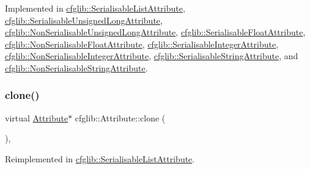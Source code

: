 Implemented in \hyperlink{classcfglib_1_1SerialisableListAttribute_a8fe3db52648fbc4d6f08a4bdf7c78ea6}{cfglib\+::\+Serialisable\+List\+Attribute}, \hyperlink{classcfglib_1_1SerialisableUnsignedLongAttribute_a5ddcd35aa3f13ae354bf6dd65839baba}{cfglib\+::\+Serialisable\+Unsigned\+Long\+Attribute}, \hyperlink{classcfglib_1_1NonSerialisableUnsignedLongAttribute_a3c01da3fbc7e617c7a919716a1142f57}{cfglib\+::\+Non\+Serialisable\+Unsigned\+Long\+Attribute}, \hyperlink{classcfglib_1_1SerialisableFloatAttribute_a2addfc6e4ad308e1e84c2b4cdac7636b}{cfglib\+::\+Serialisable\+Float\+Attribute}, \hyperlink{classcfglib_1_1NonSerialisableFloatAttribute_a8cf8fa70d97d003cf48c64c59609eeaf}{cfglib\+::\+Non\+Serialisable\+Float\+Attribute}, \hyperlink{classcfglib_1_1SerialisableIntegerAttribute_a105ce2b9dab265d56bc3229fcb7d6084}{cfglib\+::\+Serialisable\+Integer\+Attribute}, \hyperlink{classcfglib_1_1NonSerialisableIntegerAttribute_ab37d2f2a349d73177e6fdbd1356566ab}{cfglib\+::\+Non\+Serialisable\+Integer\+Attribute}, \hyperlink{classcfglib_1_1SerialisableStringAttribute_a8c1e4b8b3edbb39c85216d2b2cf8ec38}{cfglib\+::\+Serialisable\+String\+Attribute}, and \hyperlink{classcfglib_1_1NonSerialisableStringAttribute_a5a7857efb5a59c478ef31266ddfd2f2c}{cfglib\+::\+Non\+Serialisable\+String\+Attribute}.

\mbox{\label{classcfglib_1_1Attribute_a73490b82f9b31d8f30b813a2a9d3fe99}} 
\subsubsection{\texorpdfstring{clone()}{clone()}\hspace{0.1cm}{\footnotesize\ttfamily [2/2]}}
{\footnotesize\ttfamily virtual \hyperlink{classcfglib_1_1Attribute}{Attribute}$\ast$ cfglib\+::\+Attribute\+::clone (\begin{DoxyParamCaption}\item[{\hyperlink{classcfglib_1_1CloneHandle}{Clone\+Handle} \&}]{ }\end{DoxyParamCaption})\hspace{0.3cm}{\ttfamily [inline]}, {\ttfamily [virtual]}}



Reimplemented in \hyperlink{classcfglib_1_1SerialisableListAttribute_a2bcd8907e26992e725a8a10b82288a0f}{cfglib\+::\+Serialisable\+List\+Attribute}.

